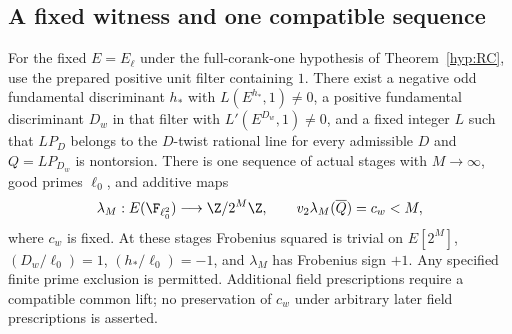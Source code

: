 \subsection{A fixed witness and one compatible sequence}
\begin{proposition}\label{ex:app-detector}
For the fixed $E=E_\ell$ under the full-corank-one hypothesis of
Theorem~\ref{hyp:RC}, use the prepared positive unit filter containing
$1$. There exist a negative odd fundamental discriminant $h_*$ with
$L(E^{h_*},1)\ne0$, a positive fundamental discriminant $D_w$ in
that filter with $L'(E^{D_w},1)\ne0$, and a fixed integer $L$ such
that $LP_D$ belongs to the $D$-twist rational line for every
admissible $D$ and $Q=LP_{D_w}$ is nontorsion.
There is one sequence of actual stages with $M\to\infty$, good
primes $\ell_0$, and additive maps
\[
 \lambda_M:E(\F_{\ell_0^2})\longrightarrow\Z/2^M\Z,
 \qquad v_2\lambda_M(\overline Q)=c_w<M,
\]
where $c_w$ is fixed. At these stages Frobenius squared is trivial
on $E[2^M]$, $(D_w/\ell_0)=1$, $(h_*/\ell_0)=-1$, and
$\lambda_M$ has Frobenius sign $+1$.
Any specified finite prime exclusion is permitted. Additional
field prescriptions require a compatible common lift; no preservation
of $c_w$ under arbitrary later field prescriptions is asserted.
\end{proposition}
